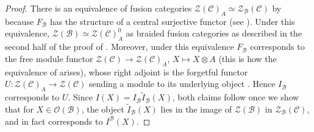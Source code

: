 \documentclass[10pt]{article}
\theoremstyle{plain}
\theoremstyle{definition}
\theoremstyle{plain}
\newcommand{\Z}{\mathcal{Z}}
\begin{document}
\begin{proof}
\par There is an equivalence of fusion categories $\Z(\mathcal{C})_A\simeq \Z_\mathcal{B}(\mathcal{C})$ by \cite[Lemma 3.5]{MR3039775} because $F_\mathcal{B}$ has the structure of a central surjective functor (see \cite[Definition 2.4]{MR3039775}). Under this equivalence, $\Z(\mathcal{B})\simeq\Z(\mathcal{C})^0_A$ as braided fusion categories as described in the second half of the proof of \cite[Theorem 4.10]{MR3039775}. Moreover, under this equivalence $F_\mathcal{B}$ corresponds to the free module functor $\Z(\mathcal{C})\to\Z(\mathcal{C})_A$, $X\mapsto X\otimes A$ (this is how the equivalence of \cite[Lemma 3.5]{MR3039775} arises), whose right adjoint is the forgetful functor $U\colon\Z(\mathcal{C})_A\to\Z(\mathcal{C})$ sending a module to its underlying object \cite[Theorem 1.6(2)]{MR1936496}. Hence $I_\mathcal{B}$ corresponds to $U$. Since $I(X)=I_\mathcal{B}\widetilde{I}_\mathcal{B}(X)$, both claims follow once we show that for $X\in\mathcal{O}(\mathcal{B})$, the object $\widetilde{I}_\mathcal{B}(X)$ lies in the image of $\mathcal{Z}(\mathcal{B})$ in $\mathcal{Z}_\mathcal{B}(\mathcal{C})$, and in fact corresponds to $I^\mathcal{B}(X)$.


\end{proof}
\end{document}
